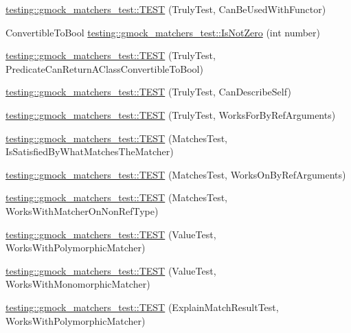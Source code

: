 \begin{DoxyCompactItemize}
\item 
\mbox{\hyperlink{namespacetesting_1_1gmock__matchers__test_ab3e259f3ae45e199474d7c6d554852f0}{testing\+::gmock\+\_\+matchers\+\_\+test\+::\+T\+E\+ST}} (Truly\+Test, Can\+Be\+Used\+With\+Functor)
\item 
Convertible\+To\+Bool \mbox{\hyperlink{namespacetesting_1_1gmock__matchers__test_a248045bc57c8bad87b7d185b5c292f60}{testing\+::gmock\+\_\+matchers\+\_\+test\+::\+Is\+Not\+Zero}} (int number)
\item 
\mbox{\hyperlink{namespacetesting_1_1gmock__matchers__test_a24529fd7834d272009af74106422fe54}{testing\+::gmock\+\_\+matchers\+\_\+test\+::\+T\+E\+ST}} (Truly\+Test, Predicate\+Can\+Return\+A\+Class\+Convertible\+To\+Bool)
\item 
\mbox{\hyperlink{namespacetesting_1_1gmock__matchers__test_af474a9719e614d521c71bdf7c39f6a7a}{testing\+::gmock\+\_\+matchers\+\_\+test\+::\+T\+E\+ST}} (Truly\+Test, Can\+Describe\+Self)
\item 
\mbox{\hyperlink{namespacetesting_1_1gmock__matchers__test_ae702d436c52bd37fe3e8d405d7e6a691}{testing\+::gmock\+\_\+matchers\+\_\+test\+::\+T\+E\+ST}} (Truly\+Test, Works\+For\+By\+Ref\+Arguments)
\item 
\mbox{\hyperlink{namespacetesting_1_1gmock__matchers__test_a6617484cbb644af9882fc5d853112aae}{testing\+::gmock\+\_\+matchers\+\_\+test\+::\+T\+E\+ST}} (Matches\+Test, Is\+Satisfied\+By\+What\+Matches\+The\+Matcher)
\item 
\mbox{\hyperlink{namespacetesting_1_1gmock__matchers__test_a6cfa391c9035262ccdc0d8f59e037b4d}{testing\+::gmock\+\_\+matchers\+\_\+test\+::\+T\+E\+ST}} (Matches\+Test, Works\+On\+By\+Ref\+Arguments)
\item 
\mbox{\hyperlink{namespacetesting_1_1gmock__matchers__test_a9fd734ae5afb64a7285503bc0870c255}{testing\+::gmock\+\_\+matchers\+\_\+test\+::\+T\+E\+ST}} (Matches\+Test, Works\+With\+Matcher\+On\+Non\+Ref\+Type)
\item 
\mbox{\hyperlink{namespacetesting_1_1gmock__matchers__test_a150118d4e990ba9fb9978329e742c931}{testing\+::gmock\+\_\+matchers\+\_\+test\+::\+T\+E\+ST}} (Value\+Test, Works\+With\+Polymorphic\+Matcher)
\item 
\mbox{\hyperlink{namespacetesting_1_1gmock__matchers__test_a53403682e9ffc12152b0b1c7f55dfa12}{testing\+::gmock\+\_\+matchers\+\_\+test\+::\+T\+E\+ST}} (Value\+Test, Works\+With\+Monomorphic\+Matcher)
\item 
\mbox{\hyperlink{namespacetesting_1_1gmock__matchers__test_a985e2bc1546b67de764d759de111e8e9}{testing\+::gmock\+\_\+matchers\+\_\+test\+::\+T\+E\+ST}} (Explain\+Match\+Result\+Test, Works\+With\+Polymorphic\+Matcher)

\end{DoxyCompactItemize}
